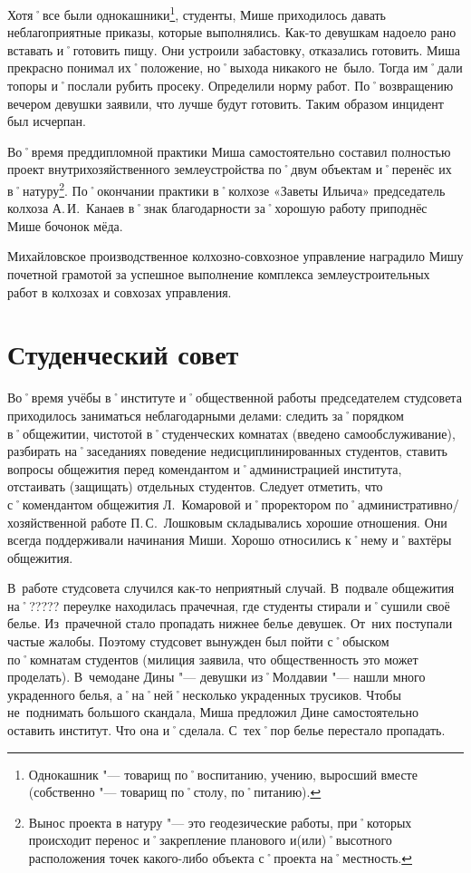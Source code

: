 Хотя˚все были однокашники\footnote{Однокашник "--- товарищ по˚воспитанию, учению, выросший вместе (собственно "--- товарищ по˚столу, по˚питанию).}, студенты, Мише приходилось давать неблагоприятные приказы, которые выполнялись. Как-то девушкам надоело рано вставать и˚готовить пищу. Они устроили забастовку, отказались готовить. Миша прекрасно понимал их˚положение, но˚выхода никакого не~было. Тогда им˚дали топоры и˚послали рубить просеку. Определили норму работ. По˚возвращению вечером девушки заявили, что лучше будут готовить. Таким образом инцидент был исчерпан. 

Во˚время преддипломной практики Миша самостоятельно составил полностью проект внутрихозяйственного землеустройства по˚двум объектам и˚перенёс их в˚натуру\footnote{Вынос проекта в натуру "--- это геодезические работы, при˚которых происходит перенос и˚закрепление планового и(или)˚высотного расположения точек какого-либо объекта с˚проекта на˚местность.}. По˚окончании практики в˚колхозе «Заветы Ильича» председатель колхоза А.\,И.~Канаев в˚знак благодарности за˚хорошую работу приподнёс Мише бочонок мёда.

Михайловское производственное колхозно-совхозное управление наградило Мишу почетной грамотой за успешное выполнение комплекса землеустроительных работ в колхозах и совхозах управления.



\section*{Студенческий совет}
\label{sec:studentCouncil}
Во˚время учёбы в˚институте и˚общественной работы председателем студсовета приходилось заниматься неблагодарными делами: следить за˚порядком в˚общежитии, чистотой в˚студенческих комнатах (введено самообслуживание), разбирать на˚заседаниях поведение недисциплинированных студентов, ставить вопросы общежития перед комендантом и˚администрацией института, отстаивать (защищать) отдельных студентов. Следует отметить, что с˚комендантом общежития Л.~Комаровой и˚проректором по˚административно\-/хозяйственной работе П.\,С.~Лошковым складывались хорошие отношения. Они всегда поддерживали начинания Миши. Хорошо относились к˚нему и˚вахтёры общежития.

В~работе студсовета случился как-то неприятный случай. В~подвале общежития на˚????? переулке находилась прачечная, где студенты стирали и˚сушили своё белье. Из~прачечной стало пропадать нижнее белье девушек. От~них поступали частые жалобы. Поэтому студсовет вынужден был пойти с˚обыском по˚комнатам студентов (милиция заявила, что общественность это может проделать). В~чемодане Дины "--- девушки из˚Молдавии "--- нашли много украденного белья, а˚на˚ней˚несколько украденных трусиков. Чтобы не~поднимать большого скандала, Миша предложил Дине самостоятельно оставить институт. Что она и˚сделала. С~тех˚пор белье перестало пропадать.

